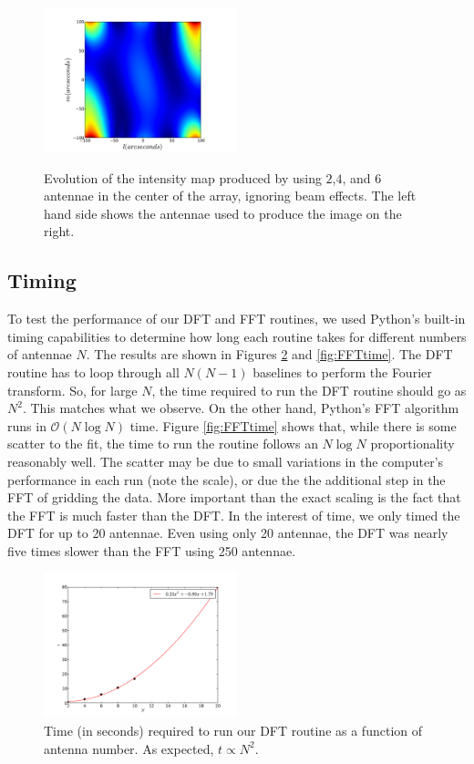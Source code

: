 \documentclass[11pt,letterpaper]{article}
\begin{document}
\begin{figure}[!h]
{\includegraphics[width=0.5\textwidth]{DFT_image_6closest.pdf}
}
\caption{ Evolution of the intensity map produced by using $2$,$4$, and $6$ antennae in the center of the array, ignoring beam effects. The left hand side shows the antennae used to produce the image on the right.}
\label{fig:evolution_wbeam}
\end{figure}

\subsection{Timing}
To test the performance of our DFT and FFT routines, we used Python's built-in 
timing capabilities to determine how long each routine takes for different 
numbers of antennae $N$.  The results are shown in Figures \ref{fig:DFTtime} and 
\ref{fig:FFTtime}.  The DFT routine has to loop through all $N(N-1)$ baselines 
to perform the Fourier transform.  So, for large $N$, the time required to 
run the DFT routine should go as $N^2$.  This matches what we observe.  On the 
other hand, Python's FFT algorithm runs in $\mathcal{O}(N\log N)$ time.  Figure 
\ref{fig:FFTtime} shows that, while there is some scatter to the fit, the time 
to run the routine follows an $N\log N$ proportionality reasonably well.  
The scatter may be due to small variations in the computer's performance in 
each run (note the scale), or due the the additional step in the FFT of 
gridding the data.  More important than the exact scaling is the fact that 
the FFT is much faster than the DFT.  In the interest of time, we only timed 
the DFT for up to 20 antennae.  Even using only 20 antennae, the DFT was nearly 
five times slower than the FFT using 250 antennae.

\begin{figure}[!h]
\centering
\includegraphics[width=0.5\textwidth]{DFT_image_timing.pdf}
\caption{Time (in seconds) required to run our DFT routine as a function of 
antenna number.  As expected, $t\propto N^2$.}
\label{fig:DFTtime}
\end{figure}
\end{document}
